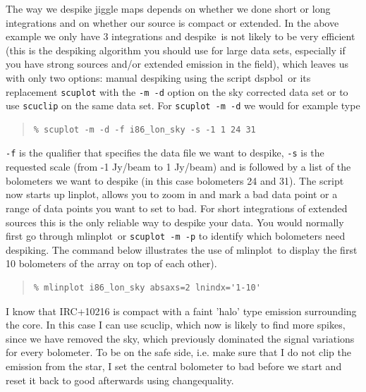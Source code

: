 \documentclass[twoside,11pt]{article}
\newenvironment{myquote}{\begin{quote}\begin{small}}{\end{small}\end{quote}}
\newcommand{\task}[1]{\textsf{#1}}
\newcommand{\chgqual}{\xref{\task{change\_\-qua\-lity}}{sun216}{CHANGE_QUALITY}}
\newcommand{\desp}{\xref{\task{despike}}{sun216}{DESPIKE}}
\newcommand{\dspbol}{\xref{\task{dspbol}}{sun216}{DSPBOL}}
\newcommand{\scuclip}{\xref{\task{scuclip}}{sun216}{SCUCLIP}}
\newcommand{\linplot}{\xref{\task{linplot}}{sun95}{LINPLOT}}
\newcommand{\mlinplot}{\xref{\task{mlinplot}}{sun95}{MLINPLOT}}
\newcommand{\xref}[3]{#1}
\renewcommand{\_}{\texttt{\symbol{95}}}
\begin{document}
The way we despike jiggle maps depends on whether we done short or long
integrations and on whether our source is compact or extended. In the
above example we only have 3 integrations and \desp\ is not likely
to be very efficient (this is the despiking algorithm you should use
for large data sets, especially if you have strong sources and/or
extended emission in the field), which leaves us with only two options:
manual despiking using the script \dspbol\ or its replacement
\texttt{scuplot} with the \texttt{-m -d} option on the sky corrected
data set or to use \texttt{scuclip} on the same data set. For
\texttt{scuplot -m -d}  we would for example type

\begin{myquote}
\begin{verbatim}
% scuplot -m -d -f i86_lon_sky -s -1 1 24 31
\end{verbatim}
\end{myquote}

\texttt{-f} is the qualifier that specifies the data file we want to
despike, \texttt{-s} is the requested scale (from -1 Jy/beam to 1
Jy/beam) and is followed by a list of the bolometers we want to despike
(in this case bolometers 24 and 31). The script now starts up \linplot,
allows you to zoom in and mark a bad data point or a range of data
points you want to set to bad. For short integrations of extended
sources this is the only reliable way to despike your data. You would
normally first go through \mlinplot\ or \texttt{scuplot -m -p} to
identify which bolometers need despiking. The command below illustrates
the use of \mlinplot\ to display the first 10 bolometers of the array
on top of each other).

\begin{myquote}
\begin{verbatim}
% mlinplot i86_lon_sky absaxs=2 lnindx='1-10'
\end{verbatim}
\end{myquote}


I know that IRC+10216 is compact with a faint 'halo' type emission
surrounding the core. In this case I can use \scuclip, which now is
likely to find more spikes, since we have removed the sky, which
previously dominated the signal variations for every bolometer. To be
on the safe side, i.e. make sure that I do not clip the emission from
the star, I set the central bolometer to bad before we start and reset
it back to good afterwards using \chgqual.
\end{document}
